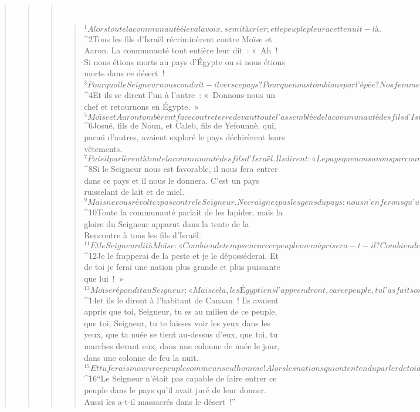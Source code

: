 \begin{verse}
\begin{verse}
\begin{verse}
         
      \bchapter{}
      \begin{verse}
${}^{1}Alors toute la communauté éleva la voix, se mit à crier ; et le peuple pleura cette nuit-là. 
${}^{2}Tous les fils d’Israël récriminèrent contre Moïse et Aaron. La communauté tout entière leur dit : « Ah ! Si nous étions morts au pays d’Égypte ou si nous étions morts dans ce désert ! 
${}^{3}Pourquoi le Seigneur nous conduit-il vers ce pays ? Pour que nous tombions par l’épée ? Nos femmes et nos enfants deviendraient un butin ! Ne serait-il pas mieux pour nous de retourner en Égypte ? » 
${}^{4}Et ils se dirent l’un à l’autre : « Donnons-nous un chef et retournons en Égypte. »
${}^{5}Moïse et Aaron tombèrent face contre terre devant toute l’assemblée de la communauté des fils d’Israël. 
${}^{6}Josué, fils de Noun, et Caleb, fils de Yefounnè, qui, parmi d’autres, avaient exploré le pays déchirèrent leurs vêtements. 
${}^{7}Puis il parlèrent à toute la communauté des fils d’Israël. Ils dirent : « Le pays que nous avons parcouru pour l’explorer, ce pays est très, très bon. 
${}^{8}Si le Seigneur nous est favorable, il nous fera entrer dans ce pays et il nous le donnera. C’est un pays ruisselant de lait et de miel. 
${}^{9}Mais ne vous révoltez pas contre le Seigneur. Ne craignez pas les gens du pays : nous n’en ferons qu’une bouchée ! Leur ombre protectrice s’est éloignée d’eux, et le Seigneur est avec nous. Ne les craignez pas ! »
${}^{10}Toute la communauté parlait de les lapider, mais la gloire du Seigneur apparut dans la tente de la Rencontre à tous les fils d’Israël. 
${}^{11}Et le Seigneur dit à Moïse : « Combien de temps encore ce peuple me méprisera-t-il ? Combien de temps refuseront-ils de croire en moi, de croire tous les signes que j’ai accomplis au milieu d’eux ? 
${}^{12}Je le frapperai de la peste et je le déposséderai. Et de toi je ferai une nation plus grande et plus puissante que lui ! » 
${}^{13}Moïse répondit au Seigneur : « Mais cela, les Égyptiens l’apprendront, car ce peuple, tu l’as fait sortir de chez eux par ta puissance, 
${}^{14}et ils le diront à l’habitant de Canaan ! Ils avaient appris que toi, Seigneur, tu es au milieu de ce peuple, que toi, Seigneur, tu te laisses voir les yeux dans les yeux, que ta nuée se tient au-dessus d’eux, que toi, tu marches devant eux, dans une colonne de nuée le jour, dans une colonne de feu la nuit. 
${}^{15}Et tu ferais mourir ce peuple comme un seul homme ! Alors les nations qui ont entendu parler de toi diraient : 
${}^{16}“Le Seigneur n’était pas capable de faire entrer ce peuple dans le pays qu’il avait juré de leur donner. Aussi les a-t-il massacrés dans le désert !” 

\end{verse}
\end{verse}
\end{verse}
\end{verse}
